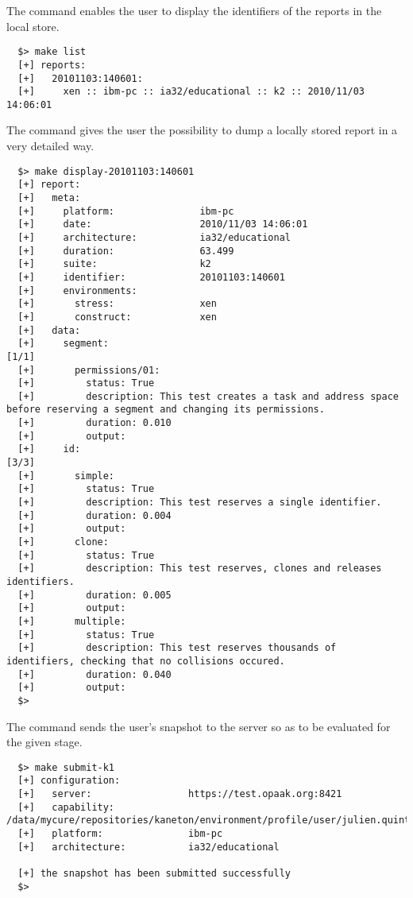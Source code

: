The  command enables the user to display the identifiers of the
reports in the local store.

\begin{verbatim}
  $> make list
  [+] reports:
  [+]   20101103:140601:
  [+]     xen :: ibm-pc :: ia32/educational :: k2 :: 2010/11/03 14:06:01
\end{verbatim}

The  command gives the user the possibility to dump a locally
stored report in a very detailed way.

\begin{verbatim}
  $> make display-20101103:140601
  [+] report:
  [+]   meta:
  [+]     platform:               ibm-pc
  [+]     date:                   2010/11/03 14:06:01
  [+]     architecture:           ia32/educational
  [+]     duration:               63.499
  [+]     suite:                  k2
  [+]     identifier:             20101103:140601
  [+]     environments:
  [+]       stress:               xen
  [+]       construct:            xen
  [+]   data:
  [+]     segment:                                                        [1/1]
  [+]       permissions/01:
  [+]         status: True
  [+]         description: This test creates a task and address space before reserving a segment and changing its permissions.
  [+]         duration: 0.010
  [+]         output: 
  [+]     id:                                                             [3/3]
  [+]       simple:
  [+]         status: True
  [+]         description: This test reserves a single identifier.
  [+]         duration: 0.004
  [+]         output: 
  [+]       clone:
  [+]         status: True
  [+]         description: This test reserves, clones and releases identifiers.
  [+]         duration: 0.005
  [+]         output: 
  [+]       multiple:
  [+]         status: True
  [+]         description: This test reserves thousands of identifiers, checking that no collisions occured.
  [+]         duration: 0.040
  [+]         output: 
  $> 
\end{verbatim}

The  command sends the user's snapshot to the server so as to
be evaluated for the given stage.

\begin{verbatim}
  $> make submit-k1
  [+] configuration:
  [+]   server:                 https://test.opaak.org:8421
  [+]   capability:             /data/mycure/repositories/kaneton/environment/profile/user/julien.quintard/julien.quintard.cap
  [+]   platform:               ibm-pc
  [+]   architecture:           ia32/educational

  [+] the snapshot has been submitted successfully
  $> 
\end{verbatim}

